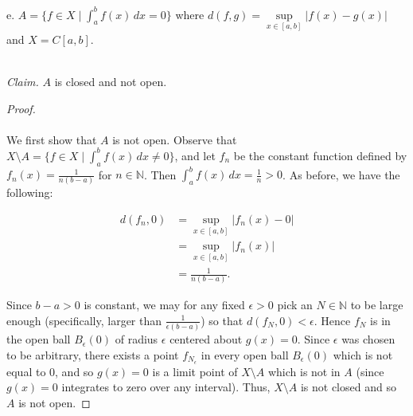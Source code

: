 \pagebreak

e.  $A = \{ f \in X \mid \int_a^b{f(x) \,dx} = 0 \}$ where $d(f, g) = \sup\limits_{x \in [a, b]}{|f(x) - g(x)|}$ and 
    $X = C[a, b]$.

\ \\
\emph{Claim.} $A$ is closed and not open.

\begin{proof}\ \\\\
    We first show that $A$ is not open. Observe that $X \setminus A = \{f \in X \mid \int_a^b{f(x) \,dx} \neq 0 \}$, and
    let $f_n$ be the constant function defined by $f_n(x) = \frac{1}{n(b - a)}$ for $n \in \mathbb{N}$. Then 
    $\int_a^b{f(x) \,dx} = \frac{1}{n} > 0$. As before, we have the following:


    \begin{align*}
         d(f_n, 0) &= \sup\limits_{x \in [a, b]}{|f_n(x) - 0|} \\ 
                   &= \sup\limits_{x \in [a, b]}{|f_n(x)|} \\ 
                   &= \frac{1}{n(b - a)}.
    \end{align*}

    Since $b - a > 0$ is constant, we may for any fixed $\epsilon > 0$ pick an $N \in \mathbb{N}$ to be large enough 
    (specifically, larger than $\frac{1}{\epsilon(b - a)}$) so that $d(f_N, 0) < \epsilon$. Hence $f_N$ is in
    the open ball $B_\epsilon(0)$ of radius $\epsilon$ centered about $g(x) = 0$. Since $\epsilon$ was chosen to be
    arbitrary, there exists a point $f_{N_\epsilon}$ in every open ball $B_\epsilon(0)$ which is not equal to 0, and so 
    $g(x) = 0$ is a limit point of $X \setminus A$ which is not in $A$ (since $g(x) = 0$ integrates to zero 
    over any interval). Thus, $X \setminus A$ is not closed and so $A$ is not open.


\end{proof}
